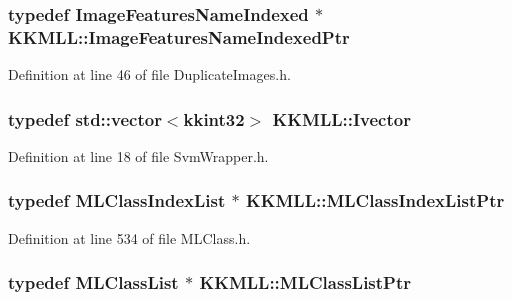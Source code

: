\subsubsection[{\texorpdfstring{Image\+Features\+Name\+Indexed\+Ptr}{ImageFeaturesNameIndexedPtr}}]{\setlength{\rightskip}{0pt plus 5cm}typedef {\bf Image\+Features\+Name\+Indexed} $\ast$ {\bf K\+K\+M\+L\+L\+::\+Image\+Features\+Name\+Indexed\+Ptr}}\hypertarget{namespace_k_k_m_l_l_a909776639f71cf2177af45e53ddc724a}{}\label{namespace_k_k_m_l_l_a909776639f71cf2177af45e53ddc724a}


Definition at line 46 of file Duplicate\+Images.\+h.

\subsubsection[{\texorpdfstring{Ivector}{Ivector}}]{\setlength{\rightskip}{0pt plus 5cm}typedef std\+::vector$<${\bf kkint32}$>$ {\bf K\+K\+M\+L\+L\+::\+Ivector}}\hypertarget{namespace_k_k_m_l_l_a7dfbe1447876f5f737f0dce1c02ce85c}{}\label{namespace_k_k_m_l_l_a7dfbe1447876f5f737f0dce1c02ce85c}


Definition at line 18 of file Svm\+Wrapper.\+h.

\subsubsection[{\texorpdfstring{M\+L\+Class\+Index\+List\+Ptr}{MLClassIndexListPtr}}]{\setlength{\rightskip}{0pt plus 5cm}typedef {\bf M\+L\+Class\+Index\+List} $\ast$ {\bf K\+K\+M\+L\+L\+::\+M\+L\+Class\+Index\+List\+Ptr}}\hypertarget{namespace_k_k_m_l_l_abf6e92f3564941506e939a17bcadfbde}{}\label{namespace_k_k_m_l_l_abf6e92f3564941506e939a17bcadfbde}


Definition at line 534 of file M\+L\+Class.\+h.

\subsubsection[{\texorpdfstring{M\+L\+Class\+List\+Ptr}{MLClassListPtr}}]{\setlength{\rightskip}{0pt plus 5cm}typedef {\bf M\+L\+Class\+List} $\ast$ {\bf K\+K\+M\+L\+L\+::\+M\+L\+Class\+List\+Ptr}}\hypertarget{namespace_k_k_m_l_l_af091cde3f4a4315658b41a5e7583fc26}{}\label{namespace_k_k_m_l_l_af091cde3f4a4315658b41a5e7583fc26}


